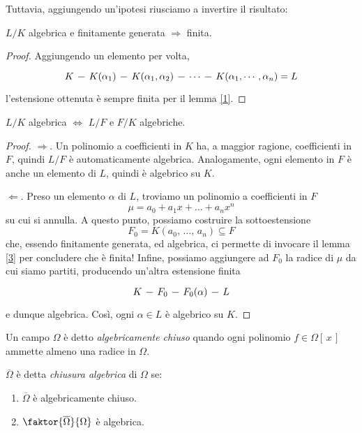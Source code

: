 \begin{multicols}{2}
Tuttavia, aggiungendo un'ipotesi riusciamo a invertire il risultato:

\begin{prop}\label{3}
	$ L/K $ algebrica e finitamente generata $ \Rightarrow $ finita.
\end{prop}
\begin{proof}
	Aggiungendo un elemento per volta,
	\[\begin{tikzcd}[column sep=0.25cm]
	K \arrow [r,-] &
	K(\alpha_1) \arrow[r,-] &
	K(\alpha_1, \alpha_2) \arrow[r,-] &
	\cdots \arrow[r,-] &
	K(\alpha_1, \cdots, \alpha_n) = L
	\end{tikzcd} \]
	 l'estensione ottenuta è sempre finita per il lemma \ref{1}.
\end{proof}
\columnbreak
\begin{prop}\label{4}
	$ L/K $ algebrica $ \Leftrightarrow $ $ L/F $ e $ F/K $ algebriche.
\end{prop}
\begin{proof}
	$ \Rightarrow $. Un polinomio a coefficienti in $ K $ ha, a maggior ragione, coefficienti in $ F $, quindi $ L/F $ è automaticamente algebrica. Analogamente, ogni elemento in $ F $ è anche un elemento di $ L $, quindi è algebrico su $ K $.
	
	$ \Leftarrow $. Preso un elemento $ \alpha $ di $ L $, troviamo un polinomio a coefficienti in $ F $
	\[ \mu = a_0 + a_1 x + \dots + a_n x^n \]
	su cui si annulla. A questo punto, possiamo costruire la sottoestensione
	\[ F_0 = K(a_0,\, \dots,\, a_n) \subseteq F \]
	che, essendo finitamente generata, ed algebrica, ci permette di invocare il lemma \ref{3} per concludere che è finita! Infine, possiamo aggiungere ad $ F_0 $ la radice di $ \mu $ da cui siamo partiti, producendo un'altra estensione finita
	\[\begin{tikzcd}[column sep=0.25cm]
	K \arrow [r,-] &
	F_0 \arrow[r,-] &
	F_0(\alpha) \arrow[r,-] &
	L
	\end{tikzcd} \]
	e dunque algebrica. Così, ogni $ \alpha \in L $ è algebrico su $ K $.
\end{proof}

\begin{definition}
	Un campo $ \Omega $ è detto \emph{algebricamente chiuso} quando ogni polinomio $ f \in \Omega[\, x\,] $ ammette almeno una radice in $ \Omega $.
\end{definition}

\begin{definition}
	$ \overline{\Omega} $ è detta \emph{chiusura algebrica} di $ \Omega $ se:
	\begin{enumerate}
		\item $ \overline{\Omega} $ è algebricamente chiuso.
		\item $ \faktor{\overline{\Omega}}{\Omega} $ è algebrica.
	\end{enumerate}
\end{definition}


\end{multicols}
